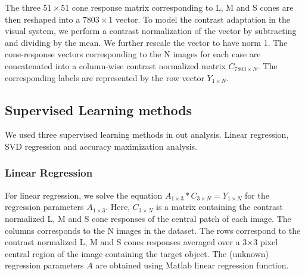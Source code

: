 \documentclass{jov}
\begin{document}
The three $51 \times 51$ cone response matrix corresponding to L, M and S cones are then reshaped into a $7803 \times 1$ vector. To model the contrast adaptation in the visual system, we perform a contrast normalization of the vector by subtracting and dividing by the mean. We further  rescale the vector to have norm 1. The cone-response vectors corresponding to the N images for each case are concatenated into a column-wise contrast normalized matrix $C_{7803\times N}$. The corresponding labels are represented by the row vector $Y_{1\times N}$.

\subsection{Supervised Learning methods} \label{method:SupervisedLearning}
We used three supervised learning methods in out analysis. Linear regression, SVD regression and accuracy maximization analysis.

\subsubsection*{Linear Regression} For linear regression, we solve the equation $A_{1\times3}*C_{3\times N} = Y_{1\times N}$ for the regression parameters $A_{1\times3}$. Here, $C_{3\times N}$ is a matrix containing the contrast normalized L, M and S cone responses of the central patch of each image. The columns corresponds to the N images in the dataset. The rows correspond to the contrast normalized L, M and S cones responses averaged over a 3$\times$3 pixel central region of the image containing the target object.  The (unknown) regression parameters $A$ are obtained using Matlab linear regression function.
\end{document}
